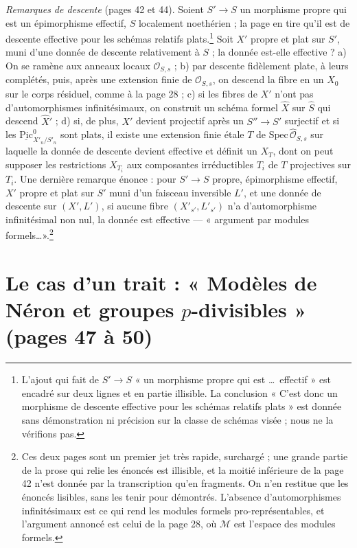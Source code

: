\documentclass[11pt,a4paper]{article}
\begin{document}
\emph{Remarques de descente} (pages 42 et 44). Soient $S' \to S$ un morphisme
propre qui est un épimorphisme effectif, $S$ localement noethérien ; la page
en tire qu'il est de descente effective pour les schémas relatifs
plats.\footnote{L'ajout qui fait de $S' \to S$ « un morphisme propre qui est
\ldots\ effectif » est encadré sur deux lignes et en partie illisible. La
conclusion « C'est donc un morphisme de descente effective pour les schémas
relatifs plats » est donnée sans démonstration ni précision sur la classe de
schémas visée ; nous ne la vérifions pas.} Soit $X'$ propre et plat sur
$S'$, muni d'une donnée de descente relativement à $S$ ; la donnée est-elle
effective ? a) On se ramène aux anneaux locaux $\mathcal{O}_{S,s}$ ; b) par
descente fidèlement plate, à leurs complétés, puis, après une extension finie
de $\mathcal{O}_{S,s}$, on descend la fibre en un $X_0$ sur le corps
résiduel, comme à la page 28 ; c) si les fibres de $X'$ n'ont pas
d'automorphismes infinitésimaux, on construit un schéma formel $\hat X$ sur
$\hat S$ qui descend $\hat X'$ ; d) si, de plus, $X'$ devient projectif après
un $S'' \to S'$ surjectif et si les $\underline{\mathrm{Pic}}^0_{X'_n/S'_n}$
sont plats, il existe une extension finie étale $T$ de
$\mathrm{Spec}\,\hat{\mathcal{O}}_{S,s}$ sur laquelle la donnée de descente
devient effective et définit un $X_T$, dont on peut supposer les restrictions
$X_{T_i}$ aux composantes irréductibles $T_i$ de $T$ projectives sur $T_i$.
Une dernière remarque énonce : pour $S' \to S$ propre, épimorphisme
effectif, $X'$ propre et plat sur $S'$ muni d'un faisceau inversible $L'$, et
une donnée de descente sur $(X', L')$, si aucune fibre $(X'_{s'}, L'_{s'})$
n'a d'automorphisme infinitésimal non nul, la donnée est effective --- « argument par modules formels\ldots ».\footnote{Ces deux pages
sont un premier jet très rapide, surchargé ; une grande partie de la prose
qui relie les énoncés est illisible, et la moitié inférieure de la page 42
n'est donnée par la transcription qu'en fragments. On n'en restitue que les
énoncés lisibles, sans les tenir pour démontrés. L'absence d'automorphismes
infinitésimaux est ce qui rend les modules formels pro-représentables, et
l'argument annoncé est celui de la page 28, où $\mathcal{M}$ est l'espace des
modules formels.}

\section*{Le cas d'un trait : « Modèles de Néron et groupes $p$-divisibles » (pages 47 à 50)}
\end{document}
